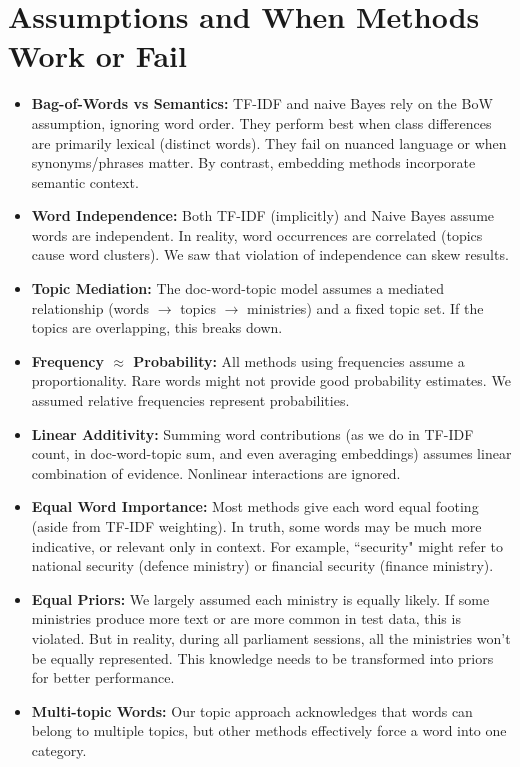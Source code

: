 \documentclass{report}
\begin{document}
\section{Assumptions and When Methods Work or Fail}
\begin{itemize}
    \item \textbf{Bag-of-Words vs Semantics:} TF-IDF and naive Bayes rely on the BoW assumption, ignoring word order. They perform best when class differences are primarily lexical (distinct words). They fail on nuanced language or when synonyms/phrases matter. By contrast, embedding methods incorporate semantic context.
    \item \textbf{Word Independence:} Both TF-IDF (implicitly) and Naive Bayes assume words are independent. In reality, word occurrences are correlated (topics cause word clusters). We saw that violation of independence can skew results.
    \item \textbf{Topic Mediation:} The doc-word-topic model assumes a mediated relationship (words $\rightarrow$ topics $\rightarrow$ ministries) and a fixed topic set. If the topics are overlapping, this breaks down.
    \item \textbf{Frequency $\approx$ Probability:} All methods using frequencies assume a proportionality. Rare words might not provide good probability estimates. We assumed relative frequencies represent probabilities.
    \item \textbf{Linear Additivity:} Summing word contributions (as we do in TF-IDF count, in doc-word-topic sum, and even averaging embeddings) assumes linear combination of evidence. Nonlinear interactions are ignored.
    \item \textbf{Equal Word Importance:} Most methods give each word equal footing (aside from TF-IDF weighting). In truth, some words may be much more indicative, or relevant only in context. For example, ``security" might refer to national security (defence ministry) or financial security (finance ministry).
    \item \textbf{Equal Priors:} We largely assumed each ministry is equally likely. If some ministries produce more text or are more common in test data, this is violated. But in reality, during all parliament sessions, all the ministries won't be equally represented. This knowledge needs to be transformed into priors for better performance.
    \item \textbf{Multi-topic Words:} Our topic approach acknowledges that words can belong to multiple topics, but other methods effectively force a word into one category.
\end{itemize}
\end{document}
